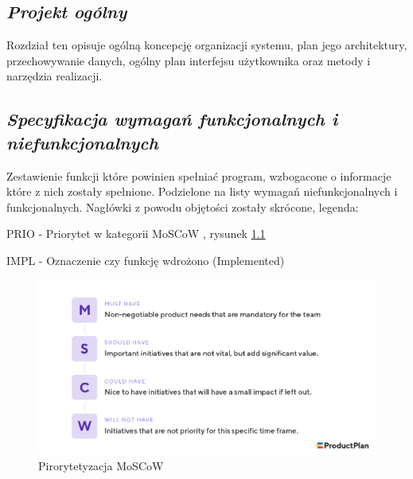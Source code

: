 \documentclass[a4paper,10pt, twoside]{report}
\newcommand{\customstylechapter}[1]{\large{\textit{#1}}}
\newcommand{\customstylesection}[1]{\textbf{\textit{#1}}}
\begin{document}
\begin{large}
\chapter{\customstylechapter{Projekt ogólny}}
{Rozdział ten opisuje ogólną koncepcję organizacji systemu, plan jego 
architektury, przechowywanie danych, ogólny plan interfejsu użytkownika oraz 
metody i narzędzia realizacji.}


\section{\customstylesection{Specyfikacja wymagań funkcjonalnych i niefunkcjonalnych}}
{Zestawienie funkcji które powinien spełniać program, wzbogacone o informacje 
które z nich zostały spełnione. Podzielone na listy wymagań niefunkcjonalnych i 
funkcjonalnych. Nagłówki z powodu objętości zostały skrócone, legenda:}

{PRIO - Priorytet w kategorii MoSCoW \cite{MOSCOW}, rysunek \ref{fig:moscow}}

{IMPL - Oznaczenie czy funkcję wdrożono (Implemented)}

\begin{figure}[H]           %
    \centering
    \includegraphics[width=12cm]{figures/MoSCoW-01.png}
    \caption{Pirorytetyzacja MoSCoW}
    \label{fig:moscow}
\end{figure}


\end{large}
\end{document}
